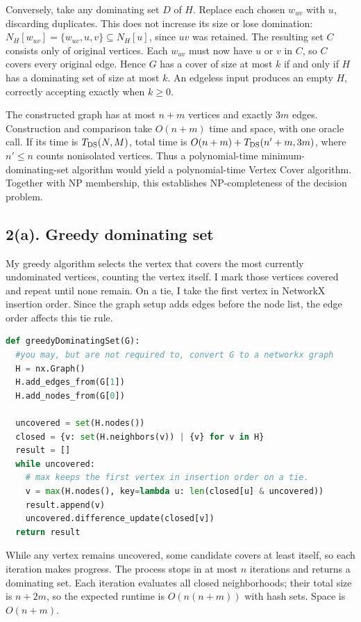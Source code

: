 Conversely, take any dominating set $D$ of $H$. Replace each chosen $w_{uv}$ with $u$, discarding duplicates. This does not increase its size or lose domination: $N_H[w_{uv}]=\{w_{uv},u,v\}\subseteq N_H[u]$, since $uv$ was retained. The resulting set $C$ consists only of original vertices. Each $w_{uv}$ must now have $u$ or $v$ in $C$, so $C$ covers every original edge. Hence $G$ has a cover of size at most $k$ if and only if $H$ has a dominating set of size at most $k$. An edgeless input produces an empty $H$, correctly accepting exactly when $k\geq0$.

The constructed graph has at most $n+m$ vertices and exactly $3m$ edges. Construction and comparison take $O(n+m)$ time and space, with one oracle call. If its time is $T_{\rm DS}(N,M)$, total time is $O(n+m)+T_{\rm DS}(n'+m,3m)$, where $n'\leq n$ counts nonisolated vertices. Thus a polynomial-time minimum-dominating-set algorithm would yield a polynomial-time Vertex Cover algorithm. Together with NP membership, this establishes NP-completeness of the decision problem.

\clearpage
\subsection*{2(a). Greedy dominating set}
My greedy algorithm selects the vertex that covers the most currently undominated vertices, counting the vertex itself. I mark those vertices covered and repeat until none remain. On a tie, I take the first vertex in NetworkX insertion order. Since the graph setup adds edges before the node list, the edge order affects this tie rule.
\begin{lstlisting}[language=Python]
def greedyDominatingSet(G):
  #you may, but are not required to, convert G to a networkx graph
  H = nx.Graph()
  H.add_edges_from(G[1])
  H.add_nodes_from(G[0])

  uncovered = set(H.nodes())
  closed = {v: set(H.neighbors(v)) | {v} for v in H}
  result = []
  while uncovered:
    # max keeps the first vertex in insertion order on a tie.
    v = max(H.nodes(), key=lambda u: len(closed[u] & uncovered))
    result.append(v)
    uncovered.difference_update(closed[v])
  return result
\end{lstlisting}

While any vertex remains uncovered, some candidate covers at least itself, so each iteration makes progress. The process stops in at most $n$ iterations and returns a dominating set. Each iteration evaluates all closed neighborhoods; their total size is $n+2m$, so the expected runtime is $O(n(n+m))$ with hash sets. Space is $O(n+m)$.

